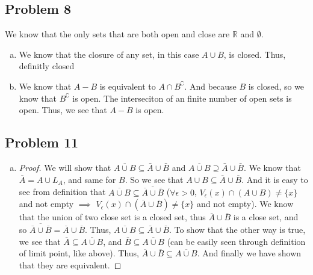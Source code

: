 \documentclass[12pt]{article}
\begin{document}
\subsection*{Problem 8}
We know that the only sets that are both open and close are $\mathbb{R}$ and $\emptyset$. 

\begin{enumerate}[a).]
    \item {
        We know that the closure of any set, in this case $ A \cup B$, is closed. 
        Thus, definitly closed
    }

    \item {
        We know that $A - B$ is equivalent to $A \cap B^\complement$.
        And because $B$ is closed, so we know that $B^\complement$ is open. 
        The interseciton of an finite number of open sets is open. 
        Thus, we see that $A - B$ is open. 
    }
\end{enumerate}

\subsection*{Problem 11}
\begin{enumerate}[a).]
    \item {
        \begin{proof}
            We will show that $\overline{A \cup B} \subseteq \bar{A} \cup \bar{B}$ and $\overline{A \cup B} \supseteq \bar{A} \cup \bar{B}$. 
            We know that $\overline{A} = A \cup L_A$, and same for $B$. 
            So we see that $A \cup B \subseteq \overline{A} \cup \overline{B}$. 
            And it is easy to see from definition that $\overline{A \cup B} \subseteq \overline{\overline{A} \cup \overline{B}}$ ($\forall \epsilon > 0$, $V_{\epsilon}(x) \cap (A \cup B) \ne \{x\}$ and not empty $\implies$ $V_{\epsilon}(x) \cap (\overline{A} \cup \overline{B}) \ne \{x\}$ and not empty). 
            We know that the union of two close set is a closed set, thus $\overline{A} \cup \overline{B}$ is a close set, and so $\overline{\overline{A} \cup \overline{B}} = \overline{A} \cup \overline{B}$.
            Thus, $\overline{A \cup B} \subseteq \bar{A} \cup \bar{B}$. 
            To show that the other way is true, we see that $\overline{A} \subseteq \overline{A \cup B}$, and $\overline{B} \subseteq \overline{A \cup B}$ (can be easily seen through definition of limit point, like above).
            Thus, $\overline{A} \cup \overline{B} \subseteq \overline{A \cup B}$.  
            And finally we have shown that they are equivalent. 
            
        \end{proof}
    }
\end{enumerate}
\end{document}
